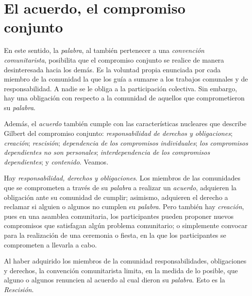\documentclass[oneside]{book}
\begin{document}
\section{El acuerdo, el compromiso conjunto}

En este sentido, la \textit{palabra}, al también pertenecer a una \textit{convención comunitarista}, posibilita que el compromiso conjunto se realice de manera desinteresada hacia los demás. Es la voluntad propia enunciada por cada miembro de la comunidad la que los guía a sumarse a los trabajos comunales y de responsabilidad. A nadie se le obliga a la participación colectiva. Sin embargo, hay una obligación con respecto a la comunidad de aquellos que comprometieron su \textit{palabra}.

Además, el \textit{acuerdo} también cumple con las características nucleares que describe Gilbert del compromiso conjunto: \textit{responsabilidad de derechos y obligaciones}; \textit{creación}; \textit{rescisión}; \textit{dependencia de los compromisos individuales}; \textit{los compromisos dependientes no son personales}; \textit{interdependencia de los compromisos dependientes}; y \textit{contenido}. Veamos.
	
Hay \textit{responsabilidad, derechos y obligaciones}. Los miembros de las comunidades que se comprometen a través de su \textit{palabra} a realizar un \textit{acuerdo}, adquieren la obligación ante su comunidad de cumplir; asimismo, adquieren el derecho a reclamar si alguien o algunos no cumplen su \textit{palabra}. Pero también hay \textit{creación}, pues en una asamblea comunitaria, los participantes pueden proponer nuevos compromisos que satisfagan algún problema comunitario; o simplemente convocar para la realización de una ceremonia o fiesta, en la que los participantes se comprometen a llevarla a cabo.
	
Al haber adquirido los miembros de la comunidad responsabilidades, obligaciones y derechos, la convención comunitarista limita, en la medida de lo posible, que alguno o algunos renuncien al acuerdo al cual dieron su \textit{palabra}. Esto es la \textit{Rescisión}.
	
\end{document}
